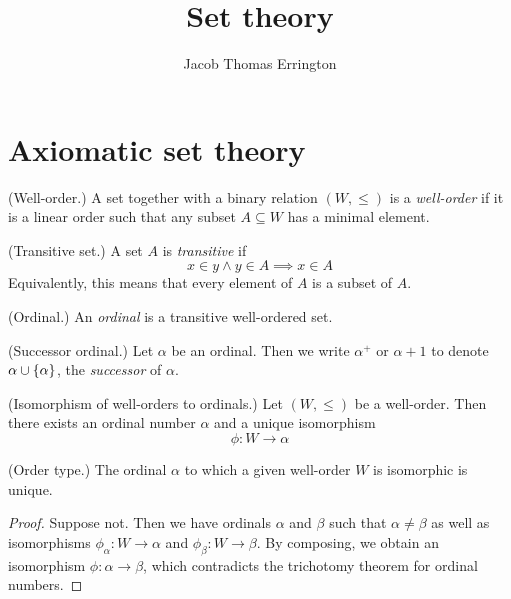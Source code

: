 \documentclass[11pt]{article}
\author{Jacob Thomas Errington}
\title{Set theory}
\date{}
\begin{document}
\maketitle

\section{Axiomatic set theory}

\begin{defn}{(Well-order.)}
    A set together with a binary relation $(W, \leq)$ is a \emph{well-order}
    if it is a linear order such that any subset $A \subseteq W$ has a minimal
    element.
\end{defn}

\begin{defn}{(Transitive set.)}
    A set $A$ is \emph{transitive} if
    \begin{equation*}
        x \in y \land y \in A \implies x \in A
    \end{equation*}
    Equivalently, this means that every element of $A$ is a subset of $A$.
\end{defn}

\begin{defn}{(Ordinal.)}
    An \emph{ordinal} is a transitive well-ordered set.
\end{defn}

\begin{defn}{(Successor ordinal.)}
    Let $\alpha$ be an ordinal.
    Then we write $\alpha^+$ or $\alpha + 1$ to denote
    $\alpha \cup \left\{\alpha\right\}$, the \emph{successor} of $\alpha$.
\end{defn}

\begin{thm}{(Isomorphism of well-orders to ordinals.)}
    Let $(W, \leq)$ be a well-order.
    Then there exists an ordinal number $\alpha$ and a unique isomorphism
    \begin{equation*}
        \phi : W \to \alpha
    \end{equation*}
\end{thm}

\begin{cor}{(Order type.)}
    The ordinal $\alpha$ to which a given well-order $W$ is isomorphic is
    unique.
\end{cor}

\begin{proof}
    Suppose not.
    Then we have ordinals $\alpha$ and $\beta$ such that $\alpha \neq \beta$ as
    well as isomorphisms $\phi_\alpha : W \to \alpha$
    and $\phi_\beta : W \to \beta$.
    By composing, we obtain an isomorphism $\phi : \alpha \to \beta$, which
    contradicts the trichotomy theorem for ordinal numbers.
\end{proof}
\end{document}
